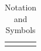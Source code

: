 \begin{table}[!h]
\begin{tabular}{ll}
\bottomrule \\[-8pt]
\end{tabular}
\caption{Notation and Symbols}
\label{tab:notation}
\end{table}
